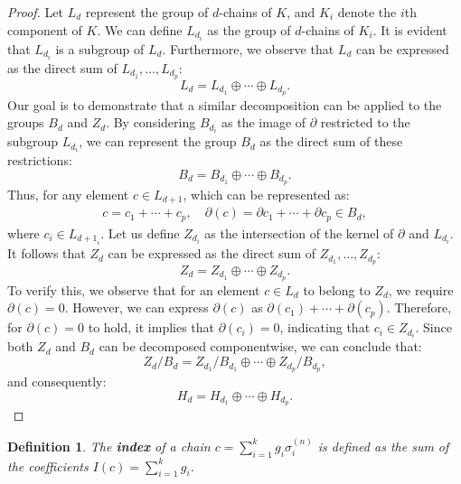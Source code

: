 \documentclass{article}
\newtheorem{definition}{Definition}[section]
\begin{document}
\begin{proof}
Let $L_d$ represent the group of $d$-chains of $K$, and $K_i$ denote the $i$th component of $K$. We can define $L_{d_i}$ as the group of $d$-chains of $K_i$. It is evident that $L_{d_i}$ is a subgroup of $L_d$. Furthermore, we observe that $L_d$ can be expressed as the direct sum of $L_{d_1}, \ldots, L_{d_p}$:
\begin{equation}
L_d = L_{d_1} \oplus \cdots \oplus L_{d_p}.
\end{equation}
Our goal is to demonstrate that a similar decomposition can be applied to the groups $B_d$ and $Z_d$. By considering $B_{d_i}$ as the image of $\partial$ restricted to the subgroup $L_{d_i}$, we can represent the group $B_d$ as the direct sum of these restrictions:
\begin{equation}
B_d = B_{d_1} \oplus \cdots \oplus B_{d_p}.
\end{equation}
Thus, for any element $c \in L_{d+1}$, which can be represented as:
\begin{align}
c = c_1 + \cdots + c_p, \quad \partial(c) = \partial c_1 + \cdots + \partial c_p \in B_d,
\end{align}
where $c_i \in L_{{d+1}_i}$.
Let us define $Z_{d_i}$ as the intersection of the kernel of $\partial$ and $L_{d_i}$. It follows that $Z_d$ can be expressed as the direct sum of $Z_{d_1}, \ldots, Z_{d_p}$:
\begin{equation}
Z_d = Z_{d_1} \oplus \cdots \oplus Z_{d_p}.
\end{equation}
To verify this, we observe that for an element $c \in L_d$ to belong to $Z_d$, we require $\partial(c) = 0$. However, we can express $\partial(c)$ as $\partial(c_1) + \cdots + \partial(c_p)$. Therefore, for $\partial(c) = 0$ to hold, it implies that $\partial(c_i) = 0$, indicating that $c_i \in Z_{d_i}$.
Since both $Z_d$ and $B_d$ can be decomposed componentwise, we can conclude that:
\begin{equation}
Z_d / B_d = Z_{d_1} / B_{d_1} \oplus \cdots \oplus Z_{d_p} / B_{d_p},
\end{equation}
and consequently:
\begin{equation}
H_d = H_{d_1} \oplus \cdots \oplus H_{d_p}.
\end{equation}
\end{proof}

\begin{definition}
The \textbf{index} of a chain $c = \sum_{i=1}^{k} g_i \sigma_i^{(n)}$ is defined as the sum of the coefficients $I(c) = \sum_{i=1}^{k} g_i$.
\end{definition}
\end{document}
